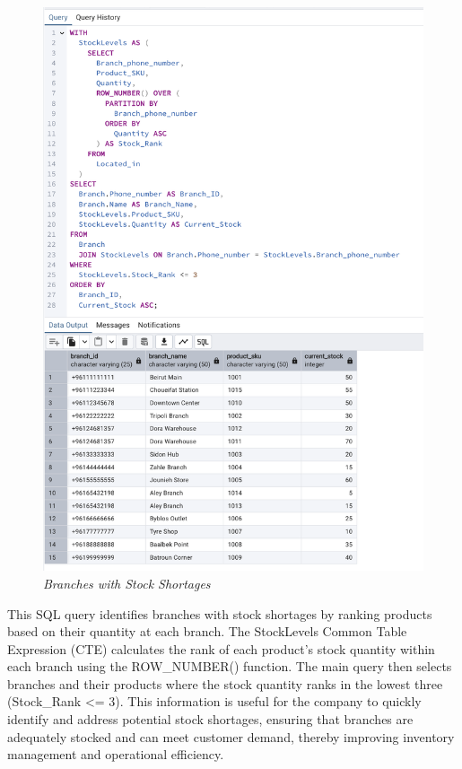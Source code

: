 


\begin{figure}[H]
  \centering
  \includegraphics[width=1\textwidth]{images/sql/complex-queries/branches_with_stock_shortages.png}
  \caption{\textit{Branches with Stock Shortages}}
\end{figure}

This SQL query identifies branches with stock shortages by ranking products based on their quantity at each branch. The StockLevels Common Table Expression (CTE) calculates the rank of each product's stock quantity within each branch using the ROW\_NUMBER() function. The main query then selects branches and their products where the stock quantity ranks in the lowest three (Stock\_Rank <= 3). This information is useful for the company to quickly identify and address potential stock shortages, ensuring that branches are adequately stocked and can meet customer demand, thereby improving inventory management and operational efficiency.

